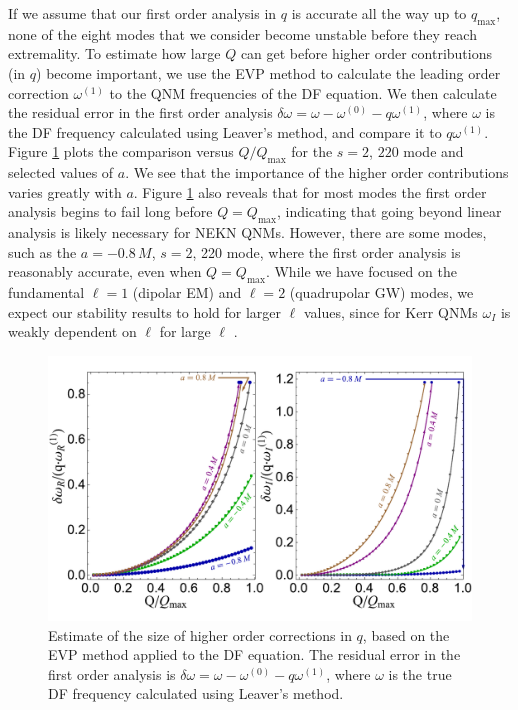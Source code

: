 \begin{refsection}
If we assume that our first order analysis in $q$ is accurate all the way up to $q_\text{max}$, none of the eight modes that we consider become unstable before they reach extremality. To estimate how large $Q$ can get before higher order contributions (in $q$) become important, we use the EVP method to calculate the leading order correction $\omega^{(1)}$ to the QNM frequencies of the DF equation.
We then calculate the residual error in the first order analysis $\delta \omega = \omega -\omega^{(0)} -q\omega^{(1)}$, where $\omega$ is the DF frequency calculated using Leaver's method, and compare it to $q\omega^{(1)}$. Figure \ref{fig:LimFirst} plots the comparison versus $Q/Q_\text{max}$ for the $s=2$, $220$ mode and selected values of $a$. We see that the importance of the higher order contributions varies greatly with $a$. Figure \ref{fig:LimFirst} also reveals that for most modes the first order analysis begins to fail long before $Q =Q_\text{max}$, indicating that going beyond linear analysis is likely necessary for NEKN QNMs.
However, there are some modes, such as the $a=-0.8\, M$, $s=2$, 220 mode, where the first order analysis is reasonably accurate, even when $Q = Q_\text{max}$.
While we have focused on the fundamental $\ell = 1$ (dipolar EM) and $\ell =2$ (quadrupolar GW) modes, we expect our stability results to hold for larger $\ell$ values, since for Kerr QNMs $\omega_I$ is weakly dependent on $\ell$ for large $\ell$ \cite{Yang2012a}.

\begin{figure}[t]
\includegraphics[width=1.0\columnwidth]{chapter_KN_QNM/etc/PRLFig2Sept17}
\caption{Estimate of the size of higher order corrections in $q$, based on the EVP method applied to the DF equation. The residual error in the first order analysis is $\delta \omega = \omega -\omega^{(0)} -q\omega^{(1)}$, where $\omega$ is the true DF frequency calculated using Leaver's method. }
\label{fig:LimFirst}
\end{figure}


\end{refsection}
